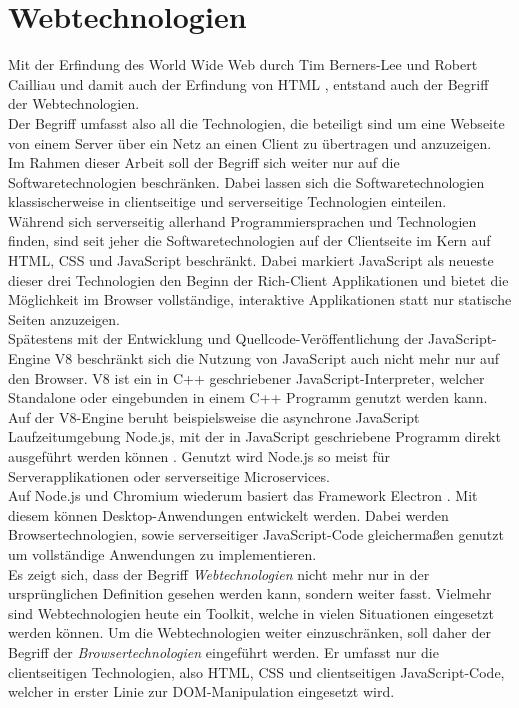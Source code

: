 \section{Webtechnologien}
\label{sec:webtechnologien}

Mit der Erfindung des World Wide Web durch Tim Berners-Lee und Robert Cailliau und damit auch der Erfindung 
von HTML \cite{www}, entstand auch der Begriff der Webtechnologien.\\
Der Begriff umfasst also all die Technologien, die beteiligt sind um eine Webseite von einem Server über ein 
Netz an einen Client zu übertragen und anzuzeigen.\\

Im Rahmen dieser Arbeit soll der Begriff sich weiter nur auf die Softwaretechnologien beschränken. Dabei lassen
sich die Softwaretechnologien klassischerweise in clientseitige und serverseitige Technologien einteilen.\\
Während sich serverseitig allerhand Programmiersprachen und Technologien finden, sind seit jeher die Softwaretechnologien
auf der Clientseite im Kern auf HTML, CSS und JavaScript beschränkt. Dabei markiert JavaScript als neueste dieser
drei Technologien \cite{jspress} den Beginn der Rich-Client Applikationen und bietet die Möglichkeit im Browser 
vollständige, interaktive Applikationen statt nur statische Seiten anzuzeigen.\\
Spätestens mit der Entwicklung und Quellcode-Veröffentlichung der JavaScript-Engine V8 \cite{v8} beschränkt sich die Nutzung
von JavaScript auch nicht mehr nur auf den Browser. V8 ist ein in C++ geschriebener JavaScript-Interpreter, 
welcher Standalone oder eingebunden in einem C++ Programm genutzt werden kann.\\
Auf der V8-Engine beruht beispielsweise die asynchrone JavaScript Laufzeitumgebung Node.js, mit der in 
JavaScript geschriebene Programm direkt ausgeführt werden können \cite{node}. Genutzt wird Node.js so meist für Serverapplikationen
oder serverseitige Microservices.\\
Auf Node.js und Chromium wiederum basiert das Framework Electron \cite{electron}. Mit diesem können Desktop-Anwendungen
entwickelt werden. Dabei werden Browsertechnologien, sowie serverseitiger JavaScript-Code gleichermaßen
genutzt um vollständige Anwendungen zu implementieren.\\

Es zeigt sich, dass der Begriff \emph{Webtechnologien} nicht mehr nur in der ursprünglichen Definition gesehen werden kann,
sondern weiter fasst. Vielmehr sind Webtechnologien heute ein Toolkit, welche in vielen Situationen eingesetzt werden
können. Um die Webtechnologien weiter einzuschränken, soll daher der Begriff der \emph{Browsertechnologien} eingeführt werden. 
Er umfasst nur die clientseitigen Technologien, also HTML, CSS und clientseitigen JavaScript-Code, welcher in erster Linie
zur DOM-Manipulation eingesetzt wird. 


